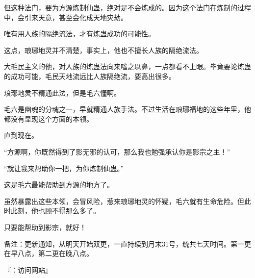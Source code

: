 \begin{this_body}
但这种法门，要为方源炼制仙蛊，绝对是不会炼成的。因为这个法门在炼制的过程中，会引来天意，甚至会化成天地灾劫。

唯有用人族的隔绝流法，才有炼蛊成功的可能性。

这点，琅琊地灵并不清楚，事实上，他也不擅长人族的隔绝流法。

大毛民主义的他，对人族的炼蛊法向来嗤之以鼻，一点都看不上眼。毕竟要论炼蛊的成功可能，毛民天地流远比人族隔绝流，要高出很多。

琅琊地灵不精通此法，但是毛六懂啊。

毛六是幽魂的分魂之一，早就精通人族手法。不过生活在琅琊福地的这些年里，他都没有显现这个方面的本领。

直到现在。

“方源啊，你既然得到了影无邪的认可，那么我也勉强承认你是影宗之主！”

“就让我来帮助你一把，为你炼制仙蛊。”

这是毛六最能帮助到方源的地方了。

虽然暴露出这些本领，会冒风险，惹来琅琊地灵的怀疑，毛六就有生命危险。但此时此刻，他也顾不得那么多了。

只要能帮助到影宗，就好！

备注：更新通知，从明天开始双更，一直持续到月末31号，统共七天时间。第一更在早八点，第二更在晚八点。

『：访问网站』

\end{this_body}

